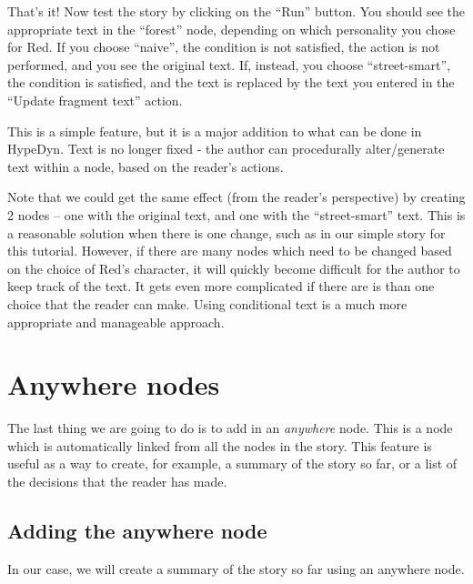 \documentclass{article}
\begin{document}
That's it! Now test the story by clicking on the ``Run'' button. You should see the appropriate text in the ``forest'' node, depending on which personality you chose for Red. If you choose ``naive'', the condition is not satisfied, the action is not performed, and you see the original text. If, instead, you choose ``street-smart'', the condition is satisfied, and the text is replaced by the text you entered in the ``Update fragment text'' action.

This is a simple feature, but it is a major addition to what can be done in HypeDyn. Text is no longer fixed - the author can procedurally alter/generate text within a node, based on the reader's actions. 

Note that we could get the same effect (from the reader's perspective) by
creating 2 nodes -- one with the original text, and one with the ``street-smart'' text. This is a reasonable solution when there is one change, such as in our simple story for this tutorial. However, if there are many nodes which need to be changed based on the choice of Red's character, it will quickly become difficult for the author to keep track of the text. It gets even more complicated if there are is than one choice that the reader can make. Using conditional text is a much more appropriate and manageable approach.

\section{Anywhere nodes}

The last thing we are going to do is to add in an \textit{anywhere} node. This is a node which is automatically linked from all the nodes in the story. This feature is useful as a way to create, for example, a summary of the story so far, or a list of the decisions that the reader has made. 

\subsection{Adding the anywhere node}
In our case, we will create a summary of the story so far using an anywhere node.
\end{document}
